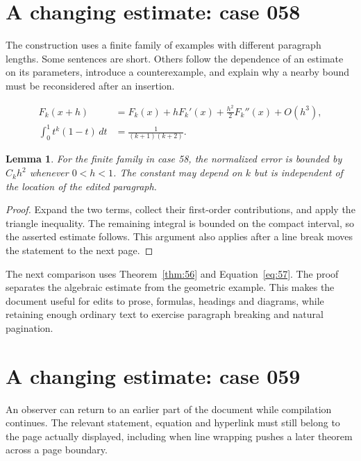 \documentclass[a4paper,10pt]{article}
\newtheorem{lemma}[theorem]{Lemma}
\begin{document}
\lipsum[8]

\section{A changing estimate: case 058}\label{unit:57}
The construction uses a finite family of examples with different paragraph lengths. Some sentences are short. Others follow the dependence of an estimate on its parameters, introduce a counterexample, and explain why a nearby bound must be reconsidered after an insertion.

\lipsum[22-23]
\begin{align}\label{eq:57}
 F_k(x+h)&=F_k(x)+hF_k'(x)+\frac{h^2}{2}F_k''(x)+O(h^3),\\
 \int_0^1 t^k(1-t)\,dt&=\frac{1}{(k+1)(k+2)}.
\end{align}
\begin{lemma}\label{thm:57}
For the finite family in case 58, the normalized error is bounded by $C_k h^2$ whenever $0<h<1$. The constant may depend on $k$ but is independent of the location of the edited paragraph.
\end{lemma}
\begin{proof}
Expand the two terms, collect their first-order contributions, and apply the
triangle inequality. The remaining integral is bounded on the compact interval,
so the asserted estimate follows. This argument also applies after a line break
moves the statement to the next page.
\end{proof}
\begin{center}
\end{center}
The next comparison uses Theorem~\ref{thm:56} and Equation~\ref{eq:57}. The proof separates the algebraic estimate from the geometric example. This makes the document useful for edits to prose, formulas, headings and diagrams, while retaining enough ordinary text to exercise paragraph breaking and natural pagination.

\lipsum[13]

\section{A changing estimate: case 059}\label{unit:58}
An observer can return to an earlier part of the document while compilation continues. The relevant statement, equation and hyperlink must still belong to the page actually displayed, including when line wrapping pushes a later theorem across a page boundary.
\end{document}
